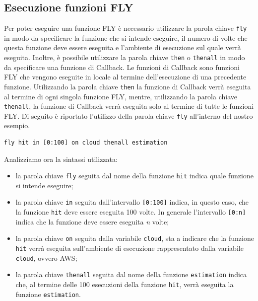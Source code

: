 \subsection{Esecuzione funzioni FLY}
Per poter eseguire una funzione FLY è necessario utilizzare la parola chiave \verb|fly| in modo da specificare la funzione che si intende eseguire, il numero di volte che questa funzione deve essere eseguita e l'ambiente di esecuzione sul quale verrà eseguita. Inoltre, è possibile utilizzare la parola chiave \verb|then| o \verb|thenall| in modo da specificare una funzione di Callback. Le funzioni di Callback sono funzioni FLY che vengono eseguite in locale al termine dell'esecuzione di una precedente funzione. Utilizzando la parola chiave \verb|then| la funzione di Callback verrà eseguita al termine di ogni singola funzione FLY, mentre, utilizzando la parola chiave \verb|thenall|, la funzione di Callback verrà eseguita solo al termine di tutte le funzioni FLY. Di seguito è riportato l'utilizzo della parola chiave \verb|fly| all'interno del nostro esempio.
\begin{lstlisting}[language=FLY,firstnumber=28,label={lst:r},belowskip=-0.8 \baselineskip]
fly hit in [0:100] on cloud thenall estimation  
\end{lstlisting}
Analizziamo ora la sintassi utilizzata:
\begin{itemize}
    \item la parola chiave \verb|fly| seguita dal nome della funzione \verb|hit| indica quale funzione si intende eseguire;
    \item la parola chiave \verb|in| seguita dall'intervallo \verb|[0:100]| indica, in questo caso, che la funzione \verb|hit| deve essere eseguita 100 volte. In generale l'intervallo \verb|[0:n]| indica che la funzione deve essere eseguita \textit{n}  volte;
    \item la parola chiave \verb|on| seguita dalla variabile \verb|cloud|, sta a indicare che la funzione \verb|hit| verrà eseguita sull'ambiente di esecuzione rappresentato dalla variabile \verb|cloud|, ovvero AWS;
    \item la parola chiave \verb|thenall| seguita dal nome della funzione \verb|estimation| indica che, al termine delle 100 esecuzioni della funzione \verb|hit|, verrà eseguita la funzione \verb|estimation|. 
\end{itemize}

